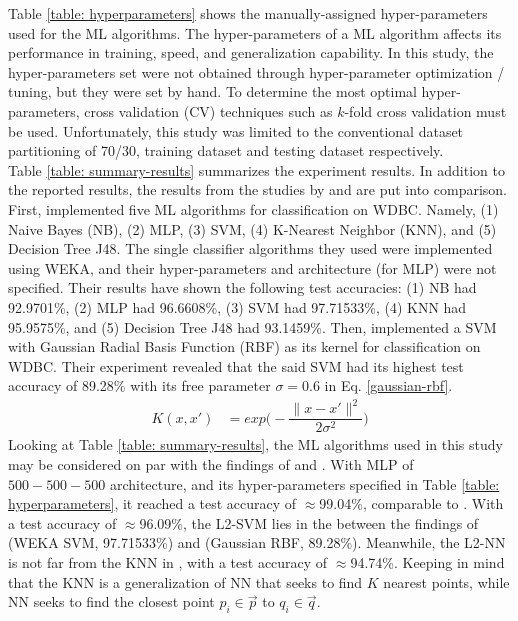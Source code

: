 \indent	Table \ref{table: hyperparameters} shows the manually-assigned hyper-parameters used for the ML algorithms. The hyper-parameters of a ML algorithm affects its performance in training, speed, and generalization capability. In this study, the hyper-parameters set were not obtained through hyper-parameter optimization / tuning, but they were set by hand. To determine the most optimal hyper-parameters, cross validation (CV) techniques such as $k$-fold cross validation must be used\cite{bengio2015deep}. Unfortunately, this study was limited to the conventional dataset partitioning of 70/30, training dataset and testing dataset respectively. \\
\indent	Table \ref{table: summary-results} summarizes the experiment results. In addition to the reported results, the results from the studies by \cite{salama2012breast} and \cite{zafiropoulos2006support} are put into comparison. First, \cite{salama2012breast} implemented five ML algorithms for classification on WDBC. Namely, (1) Naive Bayes (NB), (2) MLP, (3) SVM, (4) K-Nearest Neighbor (KNN), and (5) Decision Tree J48\cite{quinlan1993c4}. The single classifier algorithms they used were implemented using WEKA\cite{witten2016data}, and their hyper-parameters and architecture (for MLP) were not specified. Their results have shown the following test accuracies: (1) NB had 92.9701\%, (2) MLP had 96.6608\%, (3) SVM had 97.71533\%, (4) KNN had 95.9575\%, and (5) Decision Tree J48 had 93.1459\%. Then, \cite{zafiropoulos2006support} implemented a SVM with Gaussian Radial Basis Function (RBF) as its kernel for classification on WDBC. Their experiment revealed that the said SVM had its highest test accuracy of 89.28\% with its free parameter $\sigma = 0.6$ in Eq. \ref{gaussian-rbf}.
\begin{align}\label{gaussian-rbf}
	K(x, x')	&=	exp\bigg(-\dfrac{\|x - x'\|^{2}}{2\sigma^{2}}\bigg)
\end{align}
\indent	Looking at Table \ref{table: summary-results}, the ML algorithms used in this study may be considered on par with the findings of \cite{salama2012breast} and \cite{zafiropoulos2006support}. With MLP of $500-500-500$ architecture, and its hyper-parameters specified in Table \ref{table: hyperparameters}, it reached a test accuracy of $\approx$99.04\%, comparable to \cite{salama2012breast}. With a test accuracy of $\approx$96.09\%, the L2-SVM lies in the between the findings of \cite{salama2012breast}(WEKA\cite{witten2016data} SVM, 97.71533\%) and \cite{zafiropoulos2006support}(Gaussian RBF, 89.28\%). Meanwhile, the L2-NN is not far from the KNN in \cite{salama2012breast}, with a test accuracy of $\approx$94.74\%. Keeping in mind that the KNN is a generalization of NN that seeks to find $K$ nearest points, while NN seeks to find the closest point $p_{i} \in \vec{p}$ to $q_{i} \in \vec{q}$.\\
